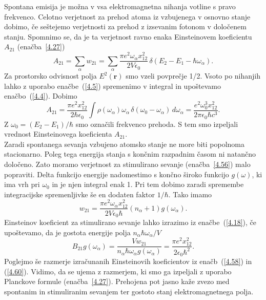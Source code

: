\noindent
Spontana emisija je možna v vsa elektromagnetna nihanja votline s
pravo frekvenco. Celotno verjetnost za prehod atoma iz vzbujenega
v osnovno stanje dobimo, če seštejemo verjetnosti za prehod z izsevanim fotonom 
v določenem stanju. Spomnimo se, da je ta verjetnost ravno enaka 
Einsteinovem koeficientu $A_{21}$ (enačba~\ref{4.27})
\begin{equation}
A_{21}=\sum_{\alpha}w_{21}=\sum_{\alpha}\frac{\pi 
e^{2}\omega_{\alpha}x_{12}^{2}}{2V\epsilon_{0}}\,\delta(E_{2}-E_{1}-\hbar\omega_{\alpha}).
\label{4.57}
\end{equation}
Za prostorsko odvisnost polja $E^{2}(\mathbf{r})$ smo vzeli povprečje
1/2. Vsoto po nihanjih lahko z uporabo enačbe~(\ref{4.5}) spremenimo v integral
in upoštevamo enačbo~(\ref{4.4}). Dobimo
\begin{equation}
A_{21}=\frac{\pi e^{2}x_{12}^{2}}{2\hbar\epsilon_{0}}\int\rho(\omega_{\alpha})\omega_\alpha\, 
\delta(\omega_{0}-\omega_{\alpha})\, d\omega_{\alpha}=\frac{e^{2}\omega_{0}^{3}x_{12}^{2}}{2\pi\epsilon_{0}\hbar c^{3}}.
\label{4.58}
\end{equation}
 Z $\omega_{0}=(E_{2}-E_{1})/\hbar$ smo označili frekvenco prehoda. S tem smo 
 izpeljali vrednost Einsteinovega koeficienta $A_{21}$. \\
 
\noindent
Zaradi spontanega sevanja vzbujeno atomsko stanje ne more biti popolnoma
stacionarno. Poleg tega energija stanja s končnim razpadnim časom ni natančno
določeno. Zato moramo verjetnost za stimulirano sevanje (enačba~\ref{4.56}) malo 
popraviti. Delta funkcijo energije nadomestimo s končno široko funkcijo $g(\omega)$, 
ki ima vrh pri $\omega_{0}$ in je njen integral enak 1. Pri tem dobimo zaradi 
spremembe integracijske spremenljivke še en dodaten faktor $1/\hbar$. Tako imamo 
\begin{equation}
w_{21}=\frac{\pi e^{2}\omega_{\alpha}x_{12}^{2}}{2V\epsilon_{0}\hbar}
(n_{\alpha}+1)g(\omega_{\alpha}).
\label{4.59}
\end{equation}
Einsteinov koeficient za stimulirano sevanje lahko izrazimo iz enačbe~(\ref{4.18}), 
če upoštevamo, da je gostota energije polja $n_{\alpha}\hbar\omega_{\alpha}/V$
\begin{equation}
B_{21}g(\omega_{\alpha})=\frac{Vw_{21}}{n_{\alpha}\hbar\omega_{\alpha} g(\omega_{\alpha})}
=\frac{\pi e^{2}x_{12}^{2}}{2\epsilon_{0}\hbar^{2}}.
\label{4.60}
\end{equation}
Poglejmo  še razmerje izračunanih Einsteinovih koeficientov iz enačb~(\ref{4.58}) in 
(\ref{4.60}). Vidimo, da se ujema z razmerjem, ki smo ga izpeljali z uporabo
Planckove formule (enačba~\ref{4.27}). Prehojena pot jasno kaže zvezo med spontanim in
stimuliranim sevanjem ter gostoto stanj elektromagnetnega polja. 
